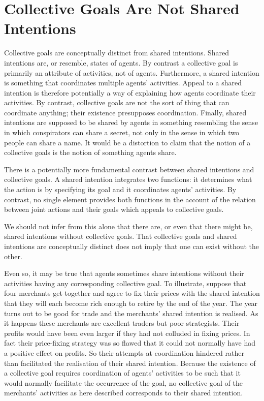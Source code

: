 \documentclass[12pt,a4paper]{extarticle}
\begin{document}
\section{Collective Goals Are Not Shared Intentions 
	\label{section_collective_vs_shared}
}
Collective goals are conceptually distinct from shared intentions.  Shared intentions are, or resemble, states of agents.  By contrast a collective goal is primarily an attribute of activities, not of agents.  Furthermore, a shared intention is something that coordinates multiple agents' activities.  Appeal to a shared intention is therefore potentially a way of explaining how agents coordinate their activities.  By contrast, collective goals are not the sort of thing that can coordinate anything; their existence presupposes coordination.  Finally, shared intentions are supposed to be shared by agents in something resembling the sense in which conspirators can share a secret, not only in the sense in which two people can share a name.  It would be a distortion to claim that the notion of a collective goals is the notion of something agents share.

There is a potentially more fundamental contrast between shared intentions and collective goals.  A shared intention integrates two functions: it determines what the action is by specifying its goal and it coordinates agents' activities.  By contrast, no single element provides both functions in the account of the relation between joint actions and their goals which appeals to collective goals.  

We should not infer from this alone that there are, or even that there might be, shared intentions without collective goals.  That collective goals and shared intentions are conceptually distinct does not imply that one can exist without the other.

Even so, it may be true that agents sometimes share intentions without their activities having any corresponding collective goal.  To illustrate, suppose that four merchants get together and agree to fix their prices with the shared intention that they will each become rich enough to retire by the end of the year.  
The year turns out to be good for trade and the merchants'  shared intention is realised.
As it happens these merchants are excellent traders but poor strategists.
Their profits would have been even larger if they had not colluded in fixing prices.
In fact their price-fixing strategy was so flawed that it could not normally have had a positive effect on profits.
So their attempts at coordination hindered rather than facilitated the realisation of their shared intention.  
Because the existence of a collective goal requires coordination of agents' activities to be such that it would normally facilitate the occurrence of the goal, no collective goal of the merchants' activities as here described corresponds to their shared intention.
\end{document}
